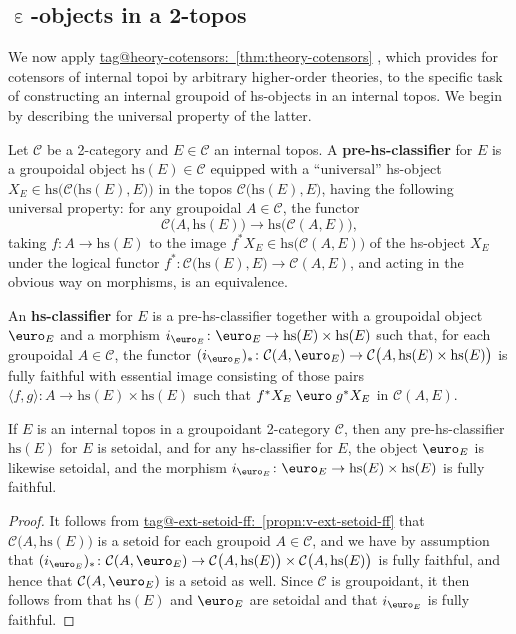 \documentclass{amsart}
\makeatletter
\newcommand\alttext{\texorpdfstring}
\newcommand\br[1]{\langle{}#1\rangle{}}
\newcommand\cC{\mathcal{C}}
\newcommand\defword[1]{{\boldmath \textbf{#1}}}
\newcommand\Ein{\mathrel{\text{\textup{\euro}}}}
\newcommand\ein{\mathrel{\varepsilon}}
\newcommand\hs{\mathrm{hs}}
\newcommand\pbig[1]{\big({#1}\big)}
\newcommand\pBig[1]{\Big({#1}\Big)}
\newcommand\unein{{\ein}}
\newcommand\unEin{{\Ein}}
\newcommand\tagword[1]{\csname tag@#1\endcsname}
\def\label@tag#1:#2\@nil{#1}
\newcommand\labeltag[1]{\label@tag#1:\@nil}
\newcommand\jref[1]{%
  \texorpdfstring%
    {\hyperref[#1]{\tagword{\labeltag{#1}}~\ref*{#1}}}%
    {\tagword{\labeltag{#1}}~\ref*{#1}}%
}
\theoremstyle{definition}
\theoremstyle{remark}
\theoremstyle{plainwithref}
\makeatother
\begin{document}
\subsection{\alttext{$\unein$}{ε}-objects in a 2-topos} \label{subsec:hs-2-topos}
We now apply \jref{thm:theory-cotensors}, which provides for cotensors of internal topoi by arbitrary higher-order theories, to the specific task of constructing an internal groupoid of hs-objects in an internal topos.
We begin by describing the universal property of the latter.

\begin{defn} \label{defn:int-topos-hs-classifier}
  Let \( \cC \) be a 2-category and \( E \in \cC \) an internal topos.
  A \defword{pre-hs-classifier} for \( E \) is a groupoidal object \( \hs(E) \in \cC \) equipped with a ``universal'' hs-object \( X_E \in \hs\pBig{\cC\pbig{\hs(E), E}} \) in the topos \( \cC\pbig{\hs(E), E} \), having the following universal property: for any groupoidal \( A \in \cC \), the functor
  \[
    \cC\pbig{A, \hs(E)} \to \hs\pbig{\cC(A, E)},
  \]
  taking \( f \colon A \to \hs(E) \) to the image \( f^* X_E \in \hs\pbig{\cC(A, E)} \) of the hs-object \( X_E \) under the logical functor \( f^* \colon \cC\pbig{\hs(E), E} \to \cC(A, E) \), and acting in the obvious way on morphisms, is an equivalence.

  An \defword{hs-classifier} for \( E \) is a pre-hs-classifier together with a groupoidal object \( \unEin_E \) and a morphism \( i_{\unEin_E} \colon \unEin_E \to \hs(E) \times \hs(E) \) such that, for each groupoidal \( A \in \cC \), the functor \( (i_{\Ein_E})_* \colon \cC(A, \unEin_E) \to \cC\pbig{A, \hs(E) \times \hs(E)} \) is fully faithful with essential image consisting of those pairs \( \br{f,g} \colon A \to \hs(E) \times \hs(E) \) such that \( f^* X_E \Ein g^* X_E \) in \( \cC(A, E) \).
\end{defn}

\begin{propn}
  If \( E \) is an internal topos in a groupoidant 2-category \( \cC \), then any pre-hs-classifier \( \hs(E) \) for \( E \) is setoidal, and for any hs-classifier for \( E \), the object \( \unEin_E \) is likewise setoidal, and the morphism \( i_{\unEin_E} \colon \unEin_E \to \hs(E) \times \hs(E) \) is fully faithful.
\end{propn}

\begin{proof}
  It follows from \jref{propn:v-ext-setoid-ff} that \( \cC\pbig{A, \hs(E)} \) is a setoid for each groupoid \( A \in \cC \), and we have by assumption that \( (i_{\unEin_E})_* \colon \cC(A, \unEin_E) \to \cC\pbig{A, \hs(E)} \times \cC\pbig{A, \hs(E)} \) is fully faithful, and hence that \( \cC(A, \unEin_E) \) is a setoid as well.
  Since \( \cC \) is groupoidant, it then follows from \cite[Theorem~6.2.1]{helfer-topoi-in-topoi} that \( \hs(E) \) and \( \unEin_E \) are setoidal and that \( i_{\unEin_E} \) is fully faithful.
\end{proof}
\end{document}
